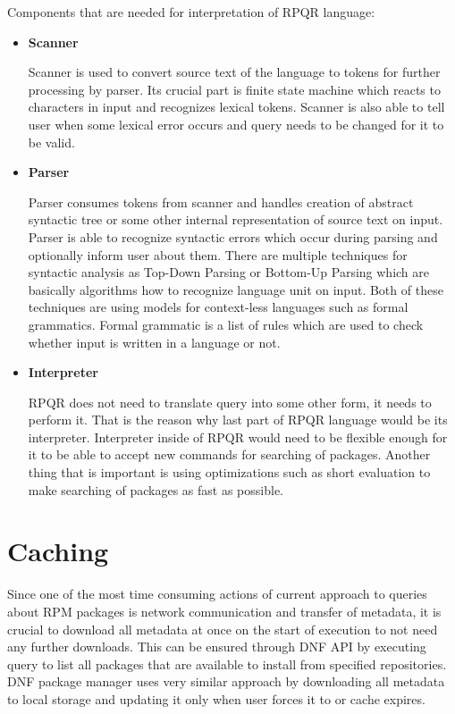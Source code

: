 Components that are needed for interpretation of RPQR language:
\begin{itemize}
  \item \textbf{Scanner}

  Scanner is used to convert source text of the language to tokens for further processing by parser.
  Its crucial part is finite state machine which reacts to characters in input and recognizes lexical
  tokens. Scanner is also able to tell user when some lexical error occurs and query needs to be
  changed for it to be valid.
  
  \item \textbf{Parser}
  
  Parser consumes tokens from scanner and handles creation of abstract syntactic tree or some other
  internal representation of source text on input. Parser is able to recognize syntactic errors
  which occur during parsing and optionally inform user about them. There are multiple techniques
  for syntactic analysis as Top-Down Parsing or Bottom-Up Parsing which are basically algorithms
  how to recognize language unit on input. Both of these techniques are using models for context-less
  languages such as formal grammatics. Formal grammatic is a list of rules which are used to check
  whether input is written in a language or not.

  \item \textbf{Interpreter}
  
  RPQR does not need to translate query into some other form, it needs to perform it. That is the
  reason why last part of RPQR language would be its interpreter. Interpreter inside of RPQR would need to be
  flexible enough for it to be able to accept new commands for searching of packages. Another thing
  that is important is using optimizations such as short evaluation to make searching of packages
  as fast as possible.
\end{itemize}

\section{Caching}
Since one of the most time consuming actions of current approach to queries about RPM packages is
network communication and transfer of metadata, it is crucial to download all metadata at once on
the start of execution to not need any further downloads. This can be ensured through DNF API by
executing query to list all packages that are available to install from specified repositories.
DNF package manager uses very similar approach by downloading all metadata to local storage and
updating it only when user forces it to or cache expires.

